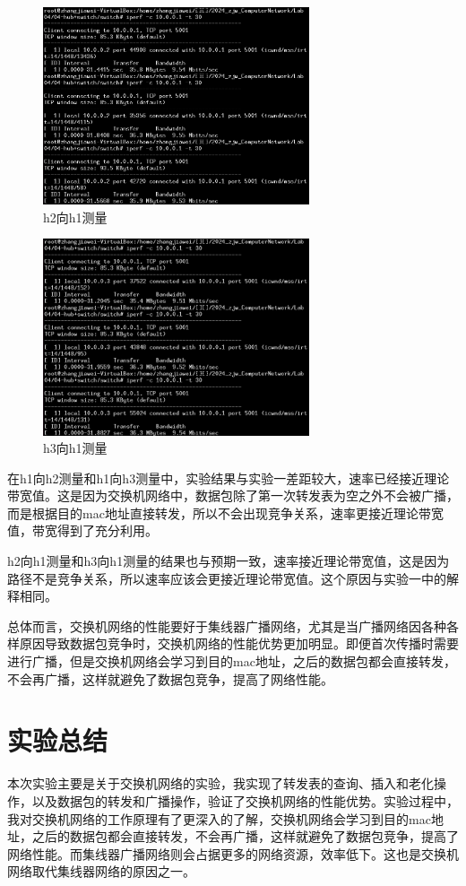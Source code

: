 \documentclass[UTF8]{report}
\begin{document}
\begin{figure}[H]
    \centering
    \includegraphics[width=0.7\textwidth]{h2toh1_2.png}
    \caption{h2向h1测量}
\end{figure}

\begin{figure}[H]
    \centering
    \includegraphics[width=0.7\textwidth]{h3toh1_2.png}
    \caption{h3向h1测量}
\end{figure}

在h1向h2测量和h1向h3测量中，实验结果与实验一差距较大，速率已经接近理论带宽值。这是因为交换机网络中，数据包除了第一次转发表为空之外不会被广播，而是根据目的mac地址直接转发，所以不会出现竞争关系，速率更接近理论带宽值，带宽得到了充分利用。

h2向h1测量和h3向h1测量的结果也与预期一致，速率接近理论带宽值，这是因为路径不是竞争关系，所以速率应该会更接近理论带宽值。这个原因与实验一中的解释相同。

总体而言，交换机网络的性能要好于集线器广播网络，尤其是当广播网络因各种各样原因导致数据包竞争时，交换机网络的性能优势更加明显。即便首次传播时需要进行广播，但是交换机网络会学习到目的mac地址，之后的数据包都会直接转发，不会再广播，这样就避免了数据包竞争，提高了网络性能。

\section{实验总结}

本次实验主要是关于交换机网络的实验，我实现了转发表的查询、插入和老化操作，以及数据包的转发和广播操作，验证了交换机网络的性能优势。实验过程中，我对交换机网络的工作原理有了更深入的了解，交换机网络会学习到目的mac地址，之后的数据包都会直接转发，不会再广播，这样就避免了数据包竞争，提高了网络性能。而集线器广播网络则会占据更多的网络资源，效率低下。这也是交换机网络取代集线器网络的原因之一。
\end{document}
